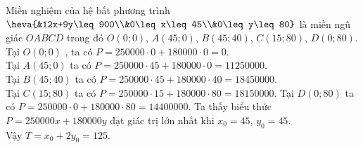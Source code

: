 \begin{bt}
{\begin{center}
	\end{center}
	Miền nghiệm của hệ bất phương trình $\heva{&12x+9y\leq 900\\&0\leq x\leq 45\\&0\leq y\leq 80}$ là miền ngũ giác $OABCD$  trong đó  $O\left(0;0\right)$, $A\left(45;0\right)$,  $B\left(45;40\right)$,  $C\left(15;80\right)$, $D\left(0;80\right)$. \\     
	Tại $O\left(0;0\right)$ , ta có $P=250000\cdot0+180000\cdot0=0$.\\  
	Tại $A\left(45;0\right)$ ta có  $P=250000\cdot45+180000\cdot0=11250000$.\\
	Tại  $B\left(45;40\right)$ ta có $P=250000\cdot45+180000\cdot40=18450000$. \\
	Tại  $C\left(15;80\right)$ ta có  $P=250000\cdot15+180000\cdot80=18150000$. 
	Tại $D\left(0;80\right)$  ta có  $P=250000\cdot0+180000\cdot80=14400000$. 
	Ta thấy biểu thức $P=250000x+180000y$   đạt giác trị lớn nhất khi $x_0=45, \, y_0=45$.\\
	Vậy $T=x_0+2y_0=125$.		
	}
\end{bt}

